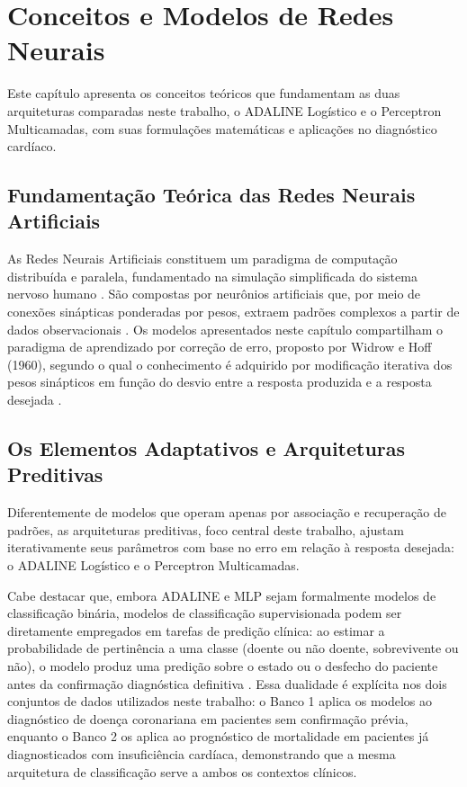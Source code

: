 \chapter{Conceitos e Modelos de Redes Neurais}
\label{cap:fundamentacao}

Este capítulo apresenta os conceitos teóricos que fundamentam as duas arquiteturas comparadas neste trabalho, o ADALINE Logístico e o Perceptron Multicamadas, com suas formulações matemáticas e aplicações no diagnóstico cardíaco.

\section{Fundamentação Teórica das Redes Neurais Artificiais}
\label{sec:fundamentacao_redes}

As Redes Neurais Artificiais constituem um paradigma de computação distribuída e paralela, fundamentado na simulação simplificada do sistema nervoso humano \cite{abdi1994}. São compostas por neurônios artificiais que, por meio de conexões sinápticas ponderadas por pesos, extraem padrões complexos a partir de dados observacionais \cite{silva2016}. Os modelos apresentados neste capítulo compartilham o paradigma de aprendizado por correção de erro, proposto por Widrow e Hoff (1960), segundo o qual o conhecimento é adquirido por modificação iterativa dos pesos sinápticos em função do desvio entre a resposta produzida e a resposta desejada \cite{braga2007}.

\section{Os Elementos Adaptativos e Arquiteturas Preditivas}

Diferentemente de modelos que operam apenas por associação e recuperação de padrões, as arquiteturas preditivas, foco central deste trabalho, ajustam iterativamente seus parâmetros com base no erro em relação à resposta desejada: o ADALINE Logístico e o Perceptron Multicamadas.

Cabe destacar que, embora ADALINE e MLP sejam formalmente modelos de classificação binária, modelos de classificação supervisionada podem ser diretamente empregados em tarefas de predição clínica: ao estimar a probabilidade de pertinência a uma classe (doente ou não doente, sobrevivente ou não), o modelo produz uma predição sobre o estado ou o desfecho do paciente antes da confirmação diagnóstica definitiva \cite{braga2007}. Essa dualidade é explícita nos dois conjuntos de dados utilizados neste trabalho: o Banco 1 aplica os modelos ao diagnóstico de doença coronariana em pacientes sem confirmação prévia, enquanto o Banco 2 os aplica ao prognóstico de mortalidade em pacientes já diagnosticados com insuficiência cardíaca, demonstrando que a mesma arquitetura de classificação serve a ambos os contextos clínicos.

